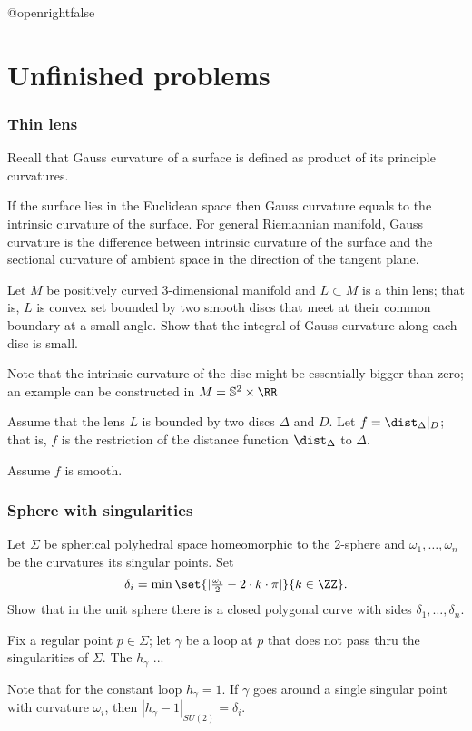 \csname @openrightfalse\endcsname
\chapter{Unfinished problems}

\subsection*{Thin lens}
\label{Thin lens}

Recall that Gauss curvature of a surface is defined as product of its principle curvatures.

If the surface lies in the Euclidean space then Gauss curvature equals to the intrinsic curvature of the surface. 
For general Riemannian manifold, Gauss curvature is the difference between intrinsic curvature of the surface and the sectional curvature of ambient space in the direction of the tangent plane.

\begin{pr}
Let $M$ be positively curved 3-dimensional manifold
and $L\subset M$ is a thin lens; that is, $L$ is convex set bounded by two smooth discs that meet at their common boundary at a small angle.
Show that the integral of Gauss curvature along each disc is small. 
\end{pr}

Note that the intrinsic curvature of the disc might be essentially bigger than zero; an example can be constructed in $M=\mathbb{S}^2\times \RR$






Assume that the lens $L$ is bounded by two discs $\Delta$ and $D$.
Let $f=\dist_{\Delta}|_D$; that is, $f$ is the restriction of the distance function $\dist_{\Delta}$ to $\Delta$.

Assume $f$ is smooth.

\subsection*{Sphere with singularities}
\label{Sphere with singular points}

\begin{pr}
Let $\Sigma$ be spherical polyhedral space homeomorphic to the 2-sphere
and $\omega_1,\dots,\omega_n$ be the curvatures its singular points.
Set
\[\delta_i=\min\set{|\tfrac{\omega_i}2-2\cdot k\cdot\pi|}{k\in\ZZ}.\]
Show that in the unit sphere there is a closed polygonal curve with sides 
$\delta_1,\dots,\delta_n$.  
\end{pr}

Fix a regular point $p\in\Sigma$;
let $\gamma$ be a loop at $p$ that does not pass thru the singularities of $\Sigma$.
The $h_\gamma$ ...

Note that for the constant loop $h_\gamma=1$.
If $\gamma$ goes around a single singular point with curvature $\omega_i$,
then $|h_\gamma-1|_{SU(2)}=\delta_i$.

